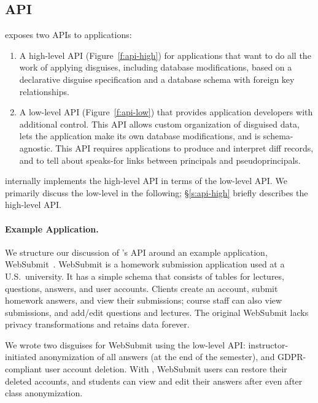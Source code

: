 \subsection{API}
\label{s:api}



\noindent
\sys exposes two APIs to applications:
%
\begin{enumerate}[nosep]
 \item A high-level API (Figure~\ref{f:api-high}) for applications that want \sys to do
   all the work of applying disguises, including database modifications, based on
   a declarative disguise specification and a database schema with foreign key
   relationships.
 \item A low-level API (Figure~\ref{f:api-low}) that provides application developers with
   additional control. This API allows custom organization of disguised data, lets the application
   make its own database modifications, and is schema-agnostic. This API requires applications
   to produce and interpret diff records, and to tell \sys about speaks-for links between
   principals and pseudoprincipals.
\end{enumerate}
%
\sys internally implements the high-level API in terms of the low-level API.
%
We primarily discuss the low-level in the following; \S\ref{s:api-high}
briefly describes the high-level API.
%

%

%
\paragraph{Example Application.}
%
We structure our discussion of \sys's API around an example application,
WebSubmit~\cite{websubmit-rs-anon}.
%
WebSubmit is a homework submission application used at a U.S.\ university.
%
It has a simple schema that consists of tables for lectures, questions, answers, and
user accounts.
%
Clients create an account, submit homework answers, and view their submissions;
course staff can also view submissions, and add/edit questions and lectures.
%
The original WebSubmit lacks privacy transformations and retains data forever.
%

%
We wrote two disguises for WebSubmit using the low-level API: \one{}
instructor-initiated anonymization of all answers (\eg at the end of the semester),
and \two{} GDPR-compliant user account deletion.
%
%
With \sys, WebSubmit users can restore their deleted accounts, and students can
view and edit their answers after even after class anonymization.
%

